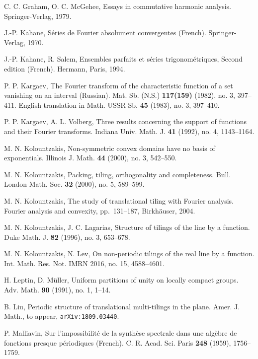 \documentclass[reqno,a4paper,12pt]{amsart}
\numberwithin{equation}{section}
\numberwithin{figure}{section}
\newcommand\1{\mathds{1}}
\theoremstyle{plain}
\theoremstyle{definition}
\begin{document}
\begin{thebibliography}{9999999}

C. C. Graham, O. C. McGehee, 
Essays in commutative harmonic analysis.
Springer-Verlag, 1979. 

J.-P. Kahane, S\'eries de Fourier absolument convergentes (French).
Springer-Verlag, 1970.

J.-P. Kahane, R. Salem, 
Ensembles parfaits et s\'eries trigonom\'etriques, Second edition
(French). Hermann, Paris, 1994.

P. P. Kargaev, 
The Fourier transform of the characteristic
function of a set vanishing on an interval (Russian).
Mat. Sb. (N.S.) \textbf{117(159)} (1982), no. 3, 397--411.
English translation in Math. USSR-Sb. \textbf{45} (1983), no. 3, 397--410.

P. P. Kargaev, A. L. Volberg, 
Three results concerning the support of functions and their Fourier transforms.
Indiana Univ. Math. J. \textbf{41} (1992), no. 4, 1143--1164.

M. N. Kolountzakis, 
Non-symmetric convex domains have no basis of exponentials.
Illinois J. Math. \textbf{44} (2000), no. 3, 542--550.

M. N. Kolountzakis, 
Packing, tiling, orthogonality and completeness. 
Bull. London Math. Soc. \textbf{32} (2000), no. 5, 589--599. 

M. N. Kolountzakis, The study of translational tiling with Fourier analysis.
Fourier analysis and convexity, pp.\ 131--187, Birkh\"auser, 2004.

M. N. Kolountzakis, J. C. Lagarias, 
Structure of tilings of the line by a function. 
Duke Math. J. \textbf{82} (1996), no. 3, 653--678. 

M. N. Kolountzakis, N. Lev, 
On non-periodic tilings of the real line by a function. 
Int. Math. Res. Not. IMRN 2016, no. 15, 4588--4601.

H. Leptin, D. M\"{u}ller,
Uniform partitions of unity on locally compact groups. 
Adv. Math. \textbf{90} (1991), no. 1, 1--14.

B. Liu,
Periodic structure of translational multi-tilings in the plane.
Amer. J. Math., to appear, \texttt{arXiv:1809.03440}.

P. Malliavin, 
Sur l'impossibilit\'e de la synth\`ese spectrale dans une alg\`ebre de fonctions presque p\'eriodiques (French).
C. R. Acad. Sci. Paris \textbf{248} (1959), 1756--1759.


\end{thebibliography}
\end{document}

